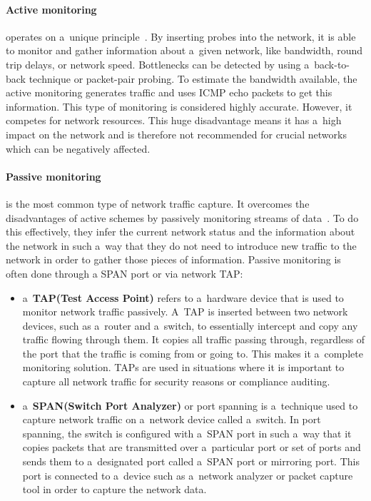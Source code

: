 \documentclass[
  printed,     %
  color,       %
  oneside,     %
  nosansbold,  %
  nocolorbold, %
  nolof,         %
  nolot,         %
]{fithesis4}
\begin{document}
\paragraph{Active monitoring} operates on a~unique principle~\cite{landfeldt2000case}. By inserting probes into the network, it is able to monitor and gather information about a~given network, like bandwidth, round trip delays, or network speed. Bottlenecks can be detected by using a~back-to-back technique or packet-pair probing. To estimate the bandwidth available, the active monitoring generates traffic and uses ICMP echo packets to get this information. This type of monitoring is considered highly accurate. However, it competes for network resources. This huge disadvantage means it has a~high impact on the network and is therefore not recommended for crucial networks which can be negatively affected.

\paragraph{Passive monitoring} is the most common type of network traffic capture. It overcomes the disadvantages of active schemes by passively monitoring streams of data~\cite{Messier2017-fz}. To do this effectively, they infer the current network status and the information about the network in such a~way that they do not need to introduce new traffic to the network in order to gather those pieces of information. Passive monitoring is often done through a SPAN port or via network TAP:

\begin{itemize}
    \item a~\textbf{TAP(Test Access Point)} refers to a~hardware device that is used to monitor network traffic passively. A~TAP is inserted between two network devices, such as a~router and a~switch, to essentially intercept and copy any traffic flowing through them. It copies all traffic passing through, regardless of the port that the traffic is coming from or going to. This makes it a~complete monitoring solution. TAPs are used in situations where it is important to capture all network traffic for security reasons or compliance auditing.
    \item a~\textbf{SPAN(Switch Port Analyzer)} or port spanning is a~technique used to capture network traffic on a~network device called a~switch. In port spanning, the switch is configured with a~SPAN port in such a~way that it copies packets that are transmitted over a~particular port or set of ports and sends them to a~designated port called a~SPAN port or mirroring port. This port is connected to a~device such as a~network analyzer or packet capture tool in order to capture the network data.
\end{itemize}
\end{document}
